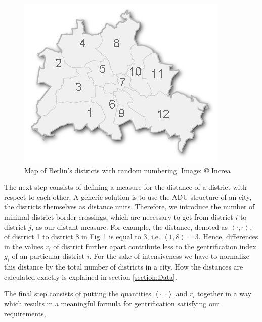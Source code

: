 \documentclass[a4paper, 10pt, conference]{ieeeconf}      %
\begin{document}
\begin{figure}
	\centering{}\includegraphics[scale=0.6]{stadtplan-berlin}
	\caption{Map of Berlin's districts with random numbering. Image: © Increa}
	\label{fig:map_berlin}
\end{figure}

The next step consists of defining a measure for the distance of a district with respect to each other. 
A generic solution is to use the ADU structure of an city, the districts themselves as distance units. 
Therefore, we introduce the number of minimal district-border-crossings, which are necessary to get from 
district $i$ to district $j$, as our distant measure. For example, the distance, denoted as $\left\langle \cdot,\cdot\right\rangle $,
of district 1 to district 8 in Fig.$\,$\ref{fig:map_berlin} is equal to 3, i.e. $\left\langle 1,8\right\rangle =3$.
Hence, differences in the values $r_{i}$ of district further apart contribute less to the gentrification index $g_{i}$
of an particular district $i$. For the sake of intensiveness we have to normalize this distance by the total number of 
districts in a city. How the distances are calculated exactly is explained in section \ref{section:Data}.

The final step consists of putting the quantities $\left\langle \cdot,\cdot\right\rangle $ and $r_{i}$ together 
in a way which results in a meaningful formula for gentrification satisfying our requirements, 
\end{document}
